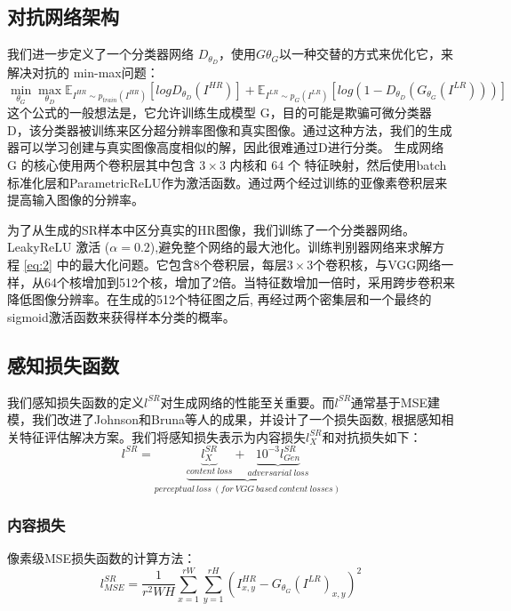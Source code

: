 \documentclass[UTF8,a4paper,10pt]{ctexrep}
\begin{document}
\subsection{对抗网络架构}
我们进一步定义了一个分类器网络 $D_{\theta_D}$，使用$G{\theta_G}$以一种交替的方式来优化它，来解决对抗的 min-max问题：
\begin{equation}
  \mathop{min}\limits_{\theta_G} \mathop{max}\limits_{\theta_D} \mathbb{E}_{I^{HR} \sim p_{train}(I^{HR})}[logD_{\theta_D}(I^{HR})] + \mathbb{E}_{I^{LR} \sim p_G(I^{LR})}[log(1 - D_{\theta_D}(G_{\theta_G}(I^{LR})))]\label{eq:2}
\end{equation}
这个公式的一般想法是，它允许训练生成模型 G，目的可能是欺骗可微分类器 D，该分类器被训练来区分超分辨率图像和真实图像。通过这种方法，我们的生成器可以学习创建与真实图像高度相似的解，因此很难通过D进行分类。
生成网络 G 的核心使用两个卷积层其中包含 $3 × 3$ 内核和 64 个 特征映射，然后使用batch标准化层和ParametricReLU作为激活函数。通过两个经过训练的亚像素卷积层来提高输入图像的分辨率。

为了从生成的SR样本中区分真实的HR图像，我们训练了一个分类器网络。LeakyReLU 激活 ($\alpha = 0.2$),避免整个网络的最大池化。训练判别器网络来求解方程 \ref{eq:2} 中的最大化问题。它包含8个卷积层，每层$3 × 3$个卷积核，与VGG网络一样，从64个核增加到512个核，增加了2倍。当特征数增加一倍时，采用跨步卷积来降低图像分辨率。在生成的512个特征图之后, 再经过两个密集层和一个最终的sigmoid激活函数来获得样本分类的概率。

\subsection{感知损失函数}
我们感知损失函数的定义$l^{SR}$对生成网络的性能至关重要。而$l^{SR}$通常基于MSE建模，我们改进了Johnson和Bruna等人的成果，并设计了一个损失函数, 根据感知相关特征评估解决方案。我们将感知损失表示为内容损失$l_X^{SR}$和对抗损失如下：
\begin{equation}
  l^{SR} = \underbrace{\underbrace{l_X^{SR}}_{content\ loss} + \underbrace{10^{-3} l_{Gen}^{SR}}_{adversarial\ loss}}_{perceptual\ loss\ (for\ VGG\ based\ content\ losses)}\label{eq:3}
\end{equation}

\subsubsection{内容损失}
像素级MSE损失函数的计算方法：
\begin{equation}
  l_{MSE}^{SR} = \frac{1}{r^2WH}\sum_{x = 1}^{rW}\sum_{y = 1}^{rH}(I_{x, y}^{HR} - G_{\theta_G}(I^{LR})_{x, y})^2\label{eq:4}
\end{equation}
\end{document}
